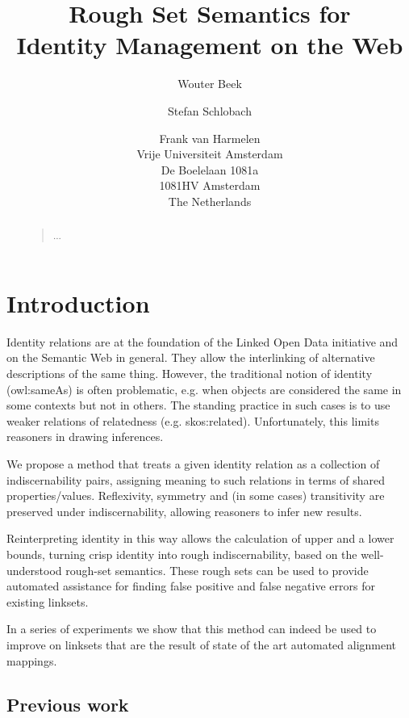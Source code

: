 \documentclass[letterpaper]{article}
\begin{document}
\title{Rough Set Semantics for\\Identity Management on the Web}
\author{Wouter Beek \and Stefan Schlobach \and Frank van Harmelen\\
Vrije Universiteit Amsterdam\\
De Boelelaan 1081a\\
1081HV Amsterdam\\
The Netherlands}
\maketitle
\begin{abstract}
\begin{quote}
...
\end{quote}
\end{abstract}

\section{Introduction}

Identity relations are at the foundation of the Linked Open Data initiative and on the Semantic Web in general. They allow the interlinking of alternative descriptions of the same thing. However, the traditional notion of identity (owl:sameAs) is often problematic, e.g. when objects are considered the same in some contexts but not in others. The standing practice in such cases is to use weaker relations of relatedness (e.g. skos:related). Unfortunately, this limits reasoners in drawing inferences. 

We propose a method that treats a given identity relation as a collection of indiscernability pairs, assigning meaning to such relations in terms of shared properties/values. Reflexivity, symmetry and (in some cases) transitivity are preserved under indiscernability, allowing reasoners to infer new results.

Reinterpreting identity in this way allows the calculation of upper and a lower bounds, turning crisp identity into rough indiscernability, based on the well-understood rough-set semantics. These rough sets can be used to provide automated assistance for finding false positive and false negative errors for existing linksets.

In a series of experiments we show that this method can indeed be used to improve on linksets that are the result of state of the art automated alignment mappings.

\subsection{Previous work}
\end{document}
